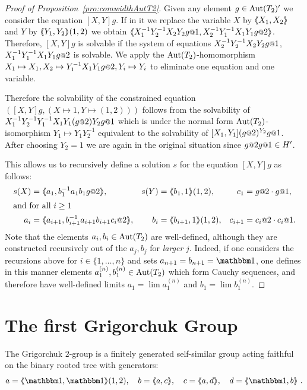 \documentclass[a4paper,11pt]{amsart}
\begin{document}
\begin{proof}[Proof of Proposition~\ref{pro:comwidthAutT2}]
 Given any element $g\in \operatorname{{Aut}}(T_2)'$ we consider the equation $[X,Y]g$. 
 If in it we replace the variable $X$ by $\langle\negthickspace\langle X_1,X_2\rangle\negthickspace\rangle$ and $Y$ by $\langle\negthickspace\langle Y_1,Y_2\rangle\negthickspace\rangle(1,2)$ 
 we obtain $\pair{X_1^{-1}Y_2^{-1}X_2Y_2g\at{1},X_2^{-1}Y_1^{-1}X_1Y_1g\at{2}}$. Therefore, $[X,Y]g$ is solvable if
 the system of equations $X_2^{-1}Y_2^{-1}X_2Y_2g\at{1}$, $X_1^{-1}Y_1^{-1}X_1Y_1g\at{2}$ is solvable.
 We apply the $\operatorname{{Aut}}(T_2)$-homomorphism $X_1\mapsto X_1,X_2\mapsto Y_1^{-1}X_1Y_1 g\at{2},Y_i\mapsto Y_i$ to eliminate one equation and one variable.
 
 Therefore the solvability of the constrained equation
 $\left([X,Y]g, (X\mapsto 1,Y\mapsto (1,2)) \right)$ follows from the solvability of
 $X_1^{-1}Y_2^{-1}Y_1^{-1}X_1Y_1(g\at{2}) Y_2 g\at{1}$ which is under the 
 normal form $\operatorname{{Aut}}(T_2)$-isomorphism $Y_1\mapsto Y_1Y_2^{-1}$ equivalent to the 
 solvability of $[X_1,Y_1](g\at{2})^{Y_2} g\at{1}$. After choosing $Y_2=1$ we are 
 again in the original situation since $g\at{2} g\at{1}\in H'$. 
 
 This allows us to recursively define a solution $s$ for the equation $[X,Y]g$ as follows:
\begin{align*}
  s(X) &= \pair{a_1,b_1^{-1}a_1b_1 g\at{2} },
& s(Y) &= \pair{b_1,1}(1,2), &c_1&=g\at{2} \cdot g\at{1}, \\
\intertext{and for all $i\geq 1$}
  a_{i} &= \pair{a_{i+1},b_{i+1}^{-1}a_{i+1}b_{i+1} c_i\at{2} }, & b_{i} &=\pair{b_{i+1},1}(1,2),&c_{i+1}&=c_{i}\at{2} \cdot c_{i}\at{1}. 
 \end{align*}
 Note that the elements $a_i,b_i\in\operatorname{{Aut}}(T_2)$ are well-defined,
 although they are constructed recursively out of the $a_j,b_j$ for
 \emph{larger} $j$. Indeed, if one considers the recursions above for
 $i\in\{1,\dots,n\}$ and sets $a_{n+1}=b_{n+1}=\id$, one defines in
 this manner elements $a_1^{(n)},b_1^{(n)}\in\operatorname{{Aut}}(T_2)$ which form
 Cauchy sequences, and therefore have well-defined limits
 $a_1=\lim a_1^{(n)}$ and $b_1=\lim b_1^{(n)}$.
\end{proof}

\section{The first Grigorchuk Group}\label{sec:GrigorchukGroup}
The Grigorchuk $2$-group is a finitely generated self-similar group acting faithful
on the binary rooted tree with generators:
\[a=\pair{\id,\id}(1,2),\quad b=\pair{a,c},\quad c=\pair{a,d},\quad d=\pair{\id,b}\ . \]
\end{document}

